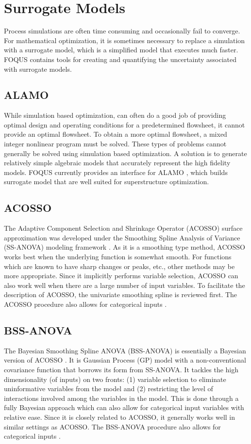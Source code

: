 \section{Surrogate Models}

Process simulations are often time consuming and occasionally fail to converge. For mathematical optimization, it is sometimes necessary to replace a simulation with a surrogate model, which is a simplified model that executes much faster. FOQUS contains tools for creating and quantifying the uncertainty associated with surrogate models.

\subsection{ALAMO}
While simulation based optimization, can often do a good job of providing optimal design and operating conditions for a predetermined flowsheet, it cannot provide an optimal flowsheet.  To obtain a more optimal flowsheet, a mixed integer nonlinear program must be solved. These types of problems cannot generally be solved using simulation based optimization. A solution is to generate relatively simple algebraic models that accurately represent the high fidelity models. FOQUS currently provides an interface for ALAMO \citep{Cozad_2014}, which builds surrogate model that are well suited for superstructure optimization.

\subsection{ACOSSO}
The Adaptive Component Selection and Shrinkage Operator (ACOSSO) surface approximation was developed under the Smoothing Spline Analysis of Variance (SS-ANOVA) modeling framework \citep{Storlie_2011}. As it is a smoothing type method, ACOSSO works best when the underlying function is somewhat smooth. For functions which are known to have sharp changes or peaks, etc., other methods may be more appropriate. Since it implicitly performs variable selection, ACOSSO can also work well when there are a large number of input variables. To facilitate the description of ACOSSO, the univariate smoothing spline is reviewed first. The ACOSSO procedure also allows for categorical inputs \citep{Storlie_2013}.

\subsection{BSS-ANOVA}
The Bayesian Smoothing Spline ANOVA (BSS-ANOVA) is essentially a Bayesian version of ACOSSO \citep{Reich_2009}. It is Gaussian Process (GP) model with a non-conventional covariance function that borrows its form from SS-ANOVA. It tackles the high dimensionality (of inputs) on two fronts: (1) variable selection to eliminate uninformative variables from the model and (2) restricting the level of interactions involved among the variables in the model. This is done through a fully Bayesian approach which can also allow for categorical input variables with relative ease. Since it is closely related to ACOSSO, it generally works well in similar settings as ACOSSO. The BSS-ANOVA procedure also allows for categorical inputs \citep{Storlie_2013}.

